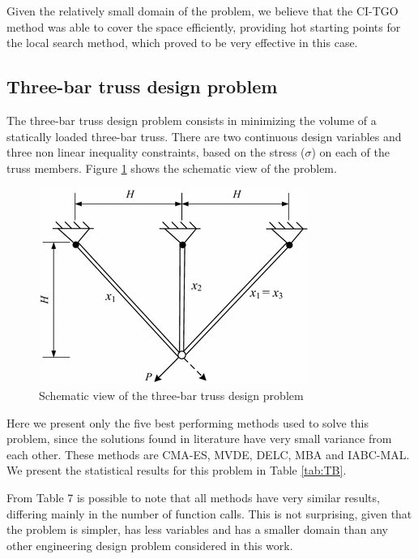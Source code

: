 Given the relatively small domain of the problem, we believe that the CI-TGO method was able to cover the space efficiently, providing hot starting points for the local search method, which proved to be very effective in this case.




\subsection{Three-bar truss design problem}

The three-bar truss design problem \citep{TB} consists in minimizing the volume of a statically loaded three-bar truss. There are two continuous design variables and three non linear inequality constraints, based on the stress ($\sigma$) on each of the truss members. Figure \ref{fig:TB} shows the schematic view of the problem.

\begin{figure}[h]
\begin{center}
\includegraphics[scale=0.5]{Imgs/TB.png}
\end{center}
\captionsetup{justification=centering}
\caption{Schematic view of the three-bar truss design problem}\label{fig:TB}
\end{figure}


Here we present only the five best performing methods used to solve this problem, since the solutions found in literature have very small variance from each other. These methods are CMA-ES, MVDE, DELC, MBA and IABC-MAL. We present the statistical results for this problem in Table \ref{tab:TB}.



From Table 7 is possible to note that all methods have very similar results, differing mainly in the number of function calls. This is not surprising, given that the problem is simpler, has less variables and has a smaller domain than any other engineering design problem considered in this work.

